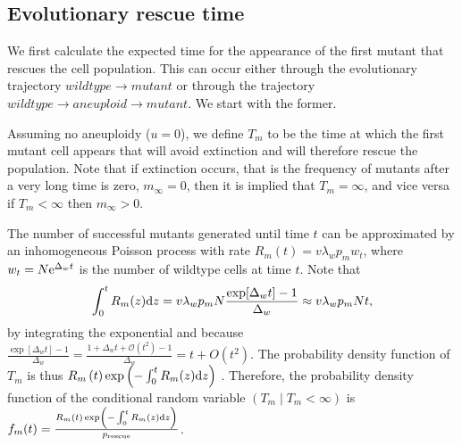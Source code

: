 \documentclass[12pt]{extarticle}
\renewcommand{\d}[1]{\ensuremath{\operatorname{d}\!{#1}}}
\renewcommand{\d}{{\rm d}}
\newcommand{\e}{{\rm e}}
\newcommand{\presc}{p_\text{rescue}}
\begin{document}
\begin{appendices}
\section{Evolutionary rescue time}\label{sec:appendix_rescue_time}

We first calculate the expected time for the appearance of the first mutant that rescues the cell population.
This can occur either through the evolutionary trajectory $wildtype \rightarrow mutant$ or through the trajectory $wildtype \rightarrow aneuploid \rightarrow mutant$.
We start with the former. 

Assuming no aneuploidy ($u=0$), we define $T_m$ to be the time at which the first mutant cell appears that will avoid extinction and will therefore rescue the population.
Note that if extinction occurs, that is the frequency of mutants after a very long time is zero, $m_{\infty}=0$, then it is implied that $T_m=\infty$, and vice versa if $T_m<\infty$ then $m_{\infty}>0$.

The number of successful mutants generated until time $t$ can be approximated by an inhomogeneous Poisson process with rate $R_m\left(t\right) = v\lambda_w p_m w_t$,
where $w_t=N\e^{\Delta_w t}$ is the number of wildtype cells at time $t$.
Note that 
\begin{equation}\label{eq:integralR}
\int_0^{t}{R_m(z)\d z} = 
v\lambda_w p_m N \frac{\exp[{\Delta_w t}]-1}{\Delta_w} \approx 
v\lambda_w p_m N t,
\end{equation}
by integrating the exponential and because $\frac{\exp[\Delta_w t]-1}{\Delta_w}=\frac{1+\Delta_w t+\mathcal{O}(t^2)-1}{\Delta_w}=t+O(t^2)$.
The probability density function of $T_m$ is thus
$R_m\left(t\right)\exp\left(-\int_0^{t}{R_m(z)\d z}\right)$ \citep{allen2010introduction}. 
Therefore, the probability density function of the conditional random variable $(T_m \mid T_m < \infty)$ is
$f_m(t) = \frac{R_m\left(t\right)\exp\left(-\int_0^{t}{R_m(z)\d z}\right)}{\presc}$. 
\\


\end{appendices}
\end{document}
